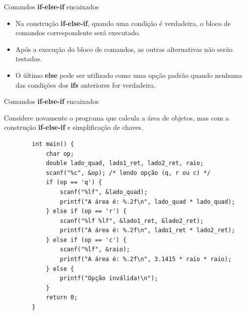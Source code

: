 \documentclass[handout]{beamer}
\begin{document}
\begin{frame}[fragile]{Comandos {\bf if-else-if} encaixados}

    \begin{itemize}[<+->]
        \item Na construção {\bf if-else-if}, quando uma condição é verdadeira, o bloco de comandos correspondente será executado.
        \item Após a execução do bloco de comandos, as outras alternativas não serão testadas.
        \item O último {\bf else} pode ser utilizado como uma opção padrão quando nenhuma das condições dos {\bf ifs} anteriores for verdadeira.
    \end{itemize}
\end{frame}

\begin{frame}[fragile]{Comandos {\bf if-else-if} encaixados}

    Considere novamente o programa que calcula a área de objetos, mas com a construção {\bf if-else-if} e simplificação de chaves.

    \begin{verbatim}
        int main() {
            char op;
            double lado_quad, lado1_ret, lado2_ret, raio;
            scanf("%c", &op); /* lendo opção (q, r ou c) */
            if (op == 'q') {
                scanf("%lf", &lado_quad);
                printf("A área é: %.2f\n", lado_quad * lado_quad);
            } else if (op == 'r') {
                scanf("%lf %lf", &lado1_ret, &lado2_ret);
                printf("A área é: %.2f\n", lado1_ret * lado2_ret);
            } else if (op == 'c') {
                scanf("%lf", &raio);
                printf("A área é: %.2f\n", 3.1415 * raio * raio);
            } else {
                printf("Opção inválida!\n");
            }
            return 0;
        }
    \end{verbatim}
\end{frame}
\end{document}
